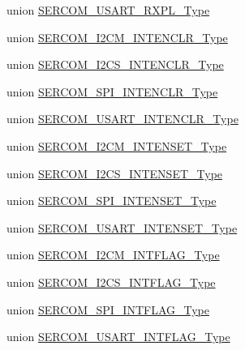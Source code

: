 \begin{DoxyCompactItemize}
\item 
union \mbox{\hyperlink{union_s_e_r_c_o_m___u_s_a_r_t___r_x_p_l___type}{S\+E\+R\+C\+O\+M\+\_\+\+U\+S\+A\+R\+T\+\_\+\+R\+X\+P\+L\+\_\+\+Type}}
\item 
union \mbox{\hyperlink{union_s_e_r_c_o_m___i2_c_m___i_n_t_e_n_c_l_r___type}{S\+E\+R\+C\+O\+M\+\_\+\+I2\+C\+M\+\_\+\+I\+N\+T\+E\+N\+C\+L\+R\+\_\+\+Type}}
\item 
union \mbox{\hyperlink{union_s_e_r_c_o_m___i2_c_s___i_n_t_e_n_c_l_r___type}{S\+E\+R\+C\+O\+M\+\_\+\+I2\+C\+S\+\_\+\+I\+N\+T\+E\+N\+C\+L\+R\+\_\+\+Type}}
\item 
union \mbox{\hyperlink{union_s_e_r_c_o_m___s_p_i___i_n_t_e_n_c_l_r___type}{S\+E\+R\+C\+O\+M\+\_\+\+S\+P\+I\+\_\+\+I\+N\+T\+E\+N\+C\+L\+R\+\_\+\+Type}}
\item 
union \mbox{\hyperlink{union_s_e_r_c_o_m___u_s_a_r_t___i_n_t_e_n_c_l_r___type}{S\+E\+R\+C\+O\+M\+\_\+\+U\+S\+A\+R\+T\+\_\+\+I\+N\+T\+E\+N\+C\+L\+R\+\_\+\+Type}}
\item 
union \mbox{\hyperlink{union_s_e_r_c_o_m___i2_c_m___i_n_t_e_n_s_e_t___type}{S\+E\+R\+C\+O\+M\+\_\+\+I2\+C\+M\+\_\+\+I\+N\+T\+E\+N\+S\+E\+T\+\_\+\+Type}}
\item 
union \mbox{\hyperlink{union_s_e_r_c_o_m___i2_c_s___i_n_t_e_n_s_e_t___type}{S\+E\+R\+C\+O\+M\+\_\+\+I2\+C\+S\+\_\+\+I\+N\+T\+E\+N\+S\+E\+T\+\_\+\+Type}}
\item 
union \mbox{\hyperlink{union_s_e_r_c_o_m___s_p_i___i_n_t_e_n_s_e_t___type}{S\+E\+R\+C\+O\+M\+\_\+\+S\+P\+I\+\_\+\+I\+N\+T\+E\+N\+S\+E\+T\+\_\+\+Type}}
\item 
union \mbox{\hyperlink{union_s_e_r_c_o_m___u_s_a_r_t___i_n_t_e_n_s_e_t___type}{S\+E\+R\+C\+O\+M\+\_\+\+U\+S\+A\+R\+T\+\_\+\+I\+N\+T\+E\+N\+S\+E\+T\+\_\+\+Type}}
\item 
union \mbox{\hyperlink{union_s_e_r_c_o_m___i2_c_m___i_n_t_f_l_a_g___type}{S\+E\+R\+C\+O\+M\+\_\+\+I2\+C\+M\+\_\+\+I\+N\+T\+F\+L\+A\+G\+\_\+\+Type}}
\item 
union \mbox{\hyperlink{union_s_e_r_c_o_m___i2_c_s___i_n_t_f_l_a_g___type}{S\+E\+R\+C\+O\+M\+\_\+\+I2\+C\+S\+\_\+\+I\+N\+T\+F\+L\+A\+G\+\_\+\+Type}}
\item 
union \mbox{\hyperlink{union_s_e_r_c_o_m___s_p_i___i_n_t_f_l_a_g___type}{S\+E\+R\+C\+O\+M\+\_\+\+S\+P\+I\+\_\+\+I\+N\+T\+F\+L\+A\+G\+\_\+\+Type}}
\item 
union \mbox{\hyperlink{union_s_e_r_c_o_m___u_s_a_r_t___i_n_t_f_l_a_g___type}{S\+E\+R\+C\+O\+M\+\_\+\+U\+S\+A\+R\+T\+\_\+\+I\+N\+T\+F\+L\+A\+G\+\_\+\+Type}}
\item 

\end{DoxyCompactItemize}

